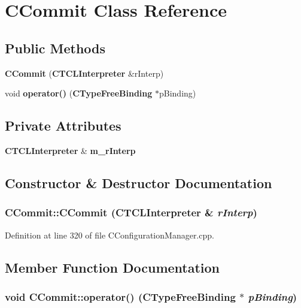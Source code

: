 \section{CCommit  Class Reference}
\label{classCCommit}
\subsection*{Public Methods}
\begin{CompactItemize}
\item 
{\bf CCommit} ({\bf CTCLInterpreter} \&r\-Interp)
\item 
void {\bf operator()} ({\bf CType\-Free\-Binding} $\ast$p\-Binding)
\end{CompactItemize}
\subsection*{Private Attributes}
\begin{CompactItemize}
\item 
{\bf CTCLInterpreter} \& {\bf m\_\-r\-Interp}
\end{CompactItemize}


\subsection{Constructor \& Destructor Documentation}
\subsubsection{\setlength{\rightskip}{0pt plus 5cm}CCommit::CCommit ({\bf CTCLInterpreter} \& {\em r\-Interp})\hspace{0.3cm}{\tt  [inline]}}\label{classCCommit_a0}




Definition at line 320 of file CConfiguration\-Manager.cpp.

\subsection{Member Function Documentation}
\subsubsection{\setlength{\rightskip}{0pt plus 5cm}void CCommit::operator() ({\bf CType\-Free\-Binding} $\ast$ {\em p\-Binding})\hspace{0.3cm}{\tt  [inline]}}\label{classCCommit_a1}




